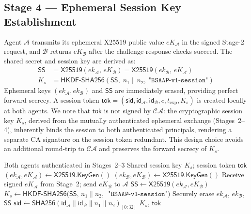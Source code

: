 \documentclass[review,5p,twocolumn,times]{elsarticle}
\begin{document}
\subsection{Stage 4 --- Ephemeral Session Key Establishment}

Agent $\mathcal{A}$ transmits its ephemeral X25519 public value $eK_\mathcal{A}$
in the signed Stage-2 request, and $\mathcal{B}$ returns $eK_\mathcal{B}$ after
the challenge-response checks succeed. The shared secret and session key are
derived as:
\begin{align}
\mathsf{SS} &= \mathsf{X25519}(ek_\mathcal{A},\, eK_\mathcal{B})
              = \mathsf{X25519}(ek_\mathcal{B},\, eK_\mathcal{A})
\label{eq:ss}\\
K_s &= \mathsf{HKDF\text{-}SHA256}\!\left(
        \mathsf{SS},\; n_1\|n_2,\; \texttt{"BSAAP-v1-session"}\right)
\label{eq:ks}
\end{align}
Ephemeral keys $(ek_\mathcal{A}, ek_\mathcal{B})$ and $\mathsf{SS}$ are
immediately erased, providing perfect forward secrecy. A session token
$\mathsf{tok} = (\mathsf{sid}, \mathsf{id}_\mathcal{A}, \mathsf{id}_\mathcal{B},
c, t_{\mathrm{exp}}, K_s)$ is created locally at both agents.
We note that $\mathsf{tok}$ is not signed by $\mathcal{CA}$: the
cryptographic session key $K_s$, derived from the mutually authenticated
ephemeral exchange (Stages~2--4), inherently binds the session to both
authenticated principals, rendering a separate CA signature on the session
token redundant. This design choice avoids an additional round-trip to
$\mathcal{CA}$ and preserves the forward secrecy of $K_s$.

\begin{algorithm}[H]
\caption{Session Key Establishment (Stage 4)}
\label{alg:key}
\begin{algorithmic}[1]
\Require Both agents authenticated in Stages~2--3
\Ensure Shared session key $K_s$; session token $\mathsf{tok}$
\State $(ek_\mathcal{A}, eK_\mathcal{A}) \leftarrow
       \mathsf{X25519.KeyGen}()$
\State $(ek_\mathcal{B}, eK_\mathcal{B}) \leftarrow
       \mathsf{X25519.KeyGen}()$
\State Receive signed $eK_\mathcal{A}$ from Stage~2; send $eK_\mathcal{B}$ to $\mathcal{A}$
\State $\mathsf{SS} \leftarrow \mathsf{X25519}(ek_\mathcal{A}, eK_\mathcal{B})$
\State $K_s \leftarrow \mathsf{HKDF\text{-}SHA256}(\mathsf{SS},\, n_1\|n_2,\,$
  $\texttt{"BSAAP-v1-session"})$
\State Securely erase $ek_\mathcal{A}$, $ek_\mathcal{B}$, $\mathsf{SS}$
\State $\mathsf{sid} \leftarrow \mathsf{SHA256}(\mathsf{id}_\mathcal{A}\|
       \mathsf{id}_\mathcal{B}\|n_1\|n_2)_{[0:32]}$
\State \Return $K_s$, $\mathsf{tok}$
\end{algorithmic}
\end{algorithm}
\end{document}

